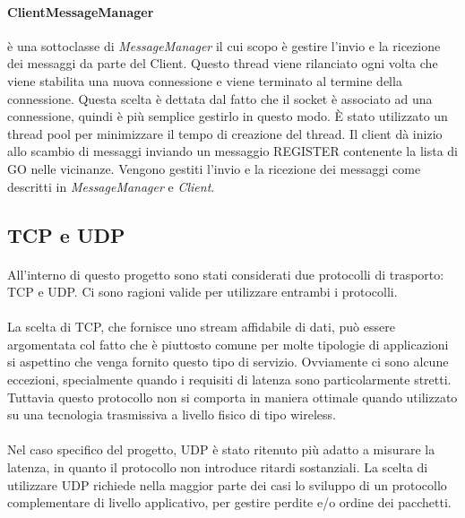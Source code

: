 \documentclass{llncs}
\begin{document}
\paragraph{ClientMessageManager} è una sottoclasse di \emph{MessageManager} il cui scopo è gestire l'invio e la ricezione dei messaggi da parte del Client. Questo thread viene rilanciato ogni volta che viene stabilita una nuova 
connessione e viene terminato al termine della connessione. Questa scelta è dettata dal fatto che il socket è associato ad una connessione, quindi è più semplice gestirlo in questo modo. È stato utilizzato un thread pool per minimizzare 
il tempo di creazione del thread. Il client dà inizio allo scambio di messaggi inviando un messaggio REGISTER contenente la lista di GO nelle vicinanze. Vengono gestiti l'invio e la ricezione dei messaggi come descritti in 
\emph{MessageManager} e \emph{Client}.

\subsection{TCP e UDP}
\paragraph{} All'interno di questo progetto sono stati considerati due protocolli di trasporto: TCP e UDP. Ci sono ragioni valide per utilizzare entrambi i protocolli.
\paragraph{} La scelta di TCP, che fornisce uno stream affidabile di dati, può essere argomentata col fatto che è piuttosto comune per molte
tipologie di applicazioni si aspettino che venga fornito questo tipo di servizio. Ovviamente ci sono alcune eccezioni, specialmente quando i requisiti di
latenza sono particolarmente stretti. Tuttavia questo protocollo non si comporta in maniera ottimale quando utilizzato su una tecnologia trasmissiva a livello fisico di tipo wireless.
\paragraph{} Nel caso specifico del progetto, UDP è stato ritenuto più adatto a misurare la latenza, in quanto il protocollo non introduce ritardi sostanziali.
La scelta di utilizzare UDP richiede nella maggior parte dei casi lo sviluppo di un protocollo complementare di livello applicativo, per gestire perdite e/o ordine dei pacchetti.
\end{document}
